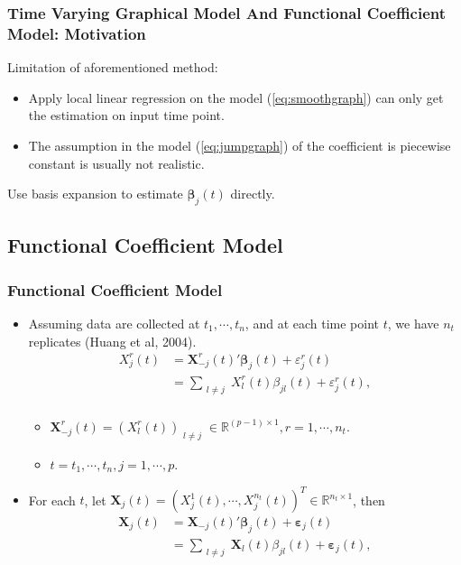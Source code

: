 \documentclass{beamer}
\newcommand{\R}{\mathbb R}
\newcommand{\bX}{\mathbf X}
\newcommand{\bbeta}{{\boldsymbol{\beta}}}
\newcommand{\bvarepsilon}{\boldsymbol{\varepsilon}}
\begin{document}

\begin{frame}
	\frametitle{Time Varying Graphical Model And Functional Coefficient Model: Motivation}

Limitation of aforementioned method:
\pause
\begin{itemize}[<+->]
	\item Apply local linear regression on the model (\ref{eq:smoothgraph}) can only get the estimation on input time point.
	\item The assumption in the model (\ref{eq:jumpgraph}) of the coefficient is piecewise constant is usually not realistic.
\end{itemize}
Use basis expansion to estimate $\bbeta_j(t)$ directly.
	
\end{frame}

\subsection{Functional Coefficient Model}
\begin{frame}
	\frametitle{Functional Coefficient Model}
	\begin{itemize}[<+->]
		\item Assuming data are collected at $t_1, \cdots, t_n$, and at each time point $t$, we have $n_t$ replicates (Huang et al, 2004). 
		\begin{equation} 
		\label{eq:flm}
		\begin{aligned}
		X_j^r(t) &= {\bX_{-j}^r(t)}' \bbeta_j(t) + \varepsilon_j^r(t)\\
		&= \sum_{\substack{l\neq j}} X_l^r(t) \beta_{jl}(t) + \varepsilon_j^r(t),\\
		\end{aligned} 
		\end{equation}
		\begin{itemize}
			\item $\bX_{-j}^r(t) = (X_l^r(t))_{\substack{l \neq j}} \in \R^{(p-1) \times 1}, r = 1, \cdots, n_t$.
			\item $t = t_1, \cdots, t_n, j = 1, \cdots, p$.
		\end{itemize}
		\item For each $t$, let $\bX_j(t) = (X_j^1(t), \cdots, X_j^{n_t}(t))^T \in \R^{n_t \times 1}$, then 
		\begin{equation}
			\label{eq:flm0}
			\begin{aligned}
			\bX_j(t) &= {\bX_{-j}(t)}' \bbeta_j(t) + \bvarepsilon_j(t)\\
			&= \sum_{\substack{l\neq j}} \bX_l(t) \beta_{jl}(t) + \bvarepsilon_j(t),\\
			\end{aligned}
		\end{equation}
	\end{itemize}
	
	
	
\end{frame}
\end{document}
